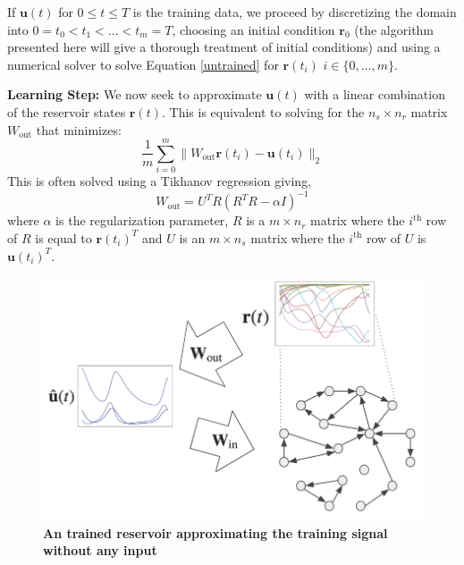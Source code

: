 \documentclass[journal]{journal}
\begin{document}
If $\mathbf{u}(t)$ for $0 \leq t \leq T$ is the training data, we proceed by discretizing the domain into $0 = t_0 <  t_1 <  ...  < t_m = T$, choosing an initial condition $\mathbf{r}_0$ (the algorithm presented here will give a thorough treatment of initial conditions) 
and using a numerical solver to solve Equation \ref{untrained} for $\mathbf{r}(t_i) \, \, i \in \{ 0, ..., m\}$.

\textbf{Learning Step: } We now seek to approximate $\mathbf{u}(t)$ with a linear combination of the reservoir states $\mathbf{r}(t)$. This is equivalent to solving for the $n_s \times n_r$ matrix $W_\text{out}$ that minimizes:
\[
\frac1m\sum_{i=0}^m \| W_\text{out} \mathbf{r}(t_i) - \mathbf{u}(t_i) \|_2
\]
This is often solved using a Tikhanov regression giving, 
\begin{equation}\label{tikhanov}
W_\text{out} = U^TR(R^TR - \alpha I)^{-1}
\end{equation}
where $\alpha$ is the regularization parameter, $R$ is a $m \times n_r$ matrix where the $i^\text{th}$ row of $R$ is equal to $\mathbf{r}(t_i)^T$ 
and $U$ is an $m \times n_s$ matrix where the $i^\text{th}$ row of $U$ is $\mathbf{u}(t_i)^T$.

\begin{figure}[h]
\centering
\includegraphics[scale=0.4]{Images/trained_rc_noeqs.png}
\caption{\textbf{An trained reservoir approximating the training signal without any input}}
\end{figure}
\end{document}
